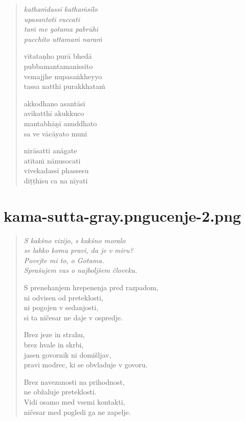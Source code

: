 

\cleartoverso

\vspace*{30mm}

\begin{verse}

\emph{kathaṁdassī kathaṁsīlo\\
upasantoti vuccati}\\
\emph{taṁ me gotama pabrūhi\\
pucchito uttamaṁ naraṁ}

vītataṇho purā bhedā\\
pubbamantamanissito\\
vemajjhe nupasaṅkheyyo\\
tassa natthi purakkhataṁ

akkodhano asantāsī\\
avikatthī akukkuco\\
mantabhāṇī anuddhato\\
sa ve vācāyato muni

nirāsatti anāgate\\
atītaṁ nānusocati\\
vivekadassī phassesu\\
diṭṭhīsu ca na nīyati

\end{verse}


\chapter[Purābheda Sutta]{{kama-sutta-gray.png}{ucenje-2.png}}

\begin{verse}


\emph{S kakšno vizijo, s kakšno moralo\\
se lahko komu pravi, da je v miru?\\
Povejte mi to, o Gotama.\\
Sprašujem vas o najboljšem človeku.}

S prenehanjem hrepenenja pred razpadom,\\
ni odvisen od preteklosti,\\
ni pogojen v sedanjosti,\\
si ta ničesar ne daje v ospredje.

Brez jeze in strahu,\\
brez hvale in skrbi,\\
jasen govornik ni domišljav,\\
pravi modrec, ki se obvladuje v govoru.

Brez navezanosti na prihodnost,\\
ne obžaluje preteklosti.\\
Vidi osamo med vsemi kontakti,\\
ničesar med pogledi ga ne zapelje.

\end{verse}

